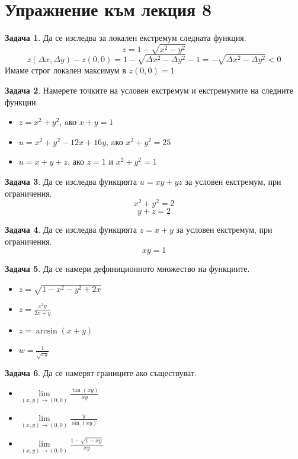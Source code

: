 \documentclass[a4paper,fleqn,12pt]{article}
\theoremstyle{definition}
\newtheorem{task}{Задача}[subsection]
\begin{document}
\newpage
\section{Упражнение към лекция 8}

\begin{task}
Да се изследва за локален екстремум следната функция.
$$z = 1-\sqrt{x^2-y^2}$$
$$z(\Delta x, \Delta y) - z(0,0) = 1-\sqrt{\Delta x^2 - \Delta y^2} - 1 = -\sqrt{\Delta x^2 - \Delta y^2}< 0$$
Имаме строг локален максимум в $z(0,0) = 1$
\end{task}

\begin{task}
Намерете точките на условен екстремум и екстремумите на следните функции.
\begin{itemize}
\item $z = x^2 + y^2$, aко $x+y=1$
\item $u = x^2 + y^2 - 12x + 16y$, aко $x^2+y^2=25$
\item $u = x + y + z$, ако $z = 1$ и $x^2 + y^2 = 1$
\end{itemize}
\end{task}

\begin{task}
Да се изследва функцията $u = xy + yz$ за условен екстремум, при ограничения.
$$x^2+y^2 = 2$$
$$y+z = 2$$
\end{task}

\begin{task}
Да се изследва функцията $z = x+y$ за условен екстремум, при ограничения.
$$xy = 1$$
\end{task}

\begin{task}
Да се намери дефиниционното множество на функциите.
\begin{itemize}
\item $z = \sqrt{1 - x^2 - y^2 + 2x}$
\item $z = \frac{x^2y}{2x+y}$
\item $z = \arcsin{(x+y)}$
\item $w = \frac{1}{\sqrt{xy}}$
\end{itemize}

\end{task}

\begin{task}
Да се намерят границите ако съществуват.
\begin{itemize}
\item $\lim\limits_{(x,y) \to (0,0)} \frac{\tan(xy)}{xy}$
\item $\lim\limits_{(x,y) \to (0,0)} \frac{y}{\sin{(xy)}}$
\item $\lim\limits_{(x,y) \to (0,0)} \frac{1 - \sqrt{1 - xy}}{xy}$
\end{itemize}
\end{task}
\end{document}
